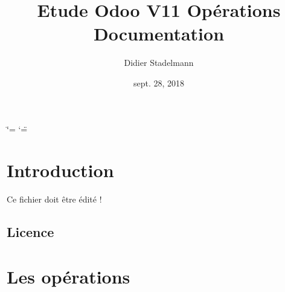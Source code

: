 \documentclass[letterpaper,10pt,french]{sphinxmanual}
\title{Etude Odoo V11 Opérations Documentation}
\date{sept. 28, 2018}
\author{Didier Stadelmann}
\begin{document}
\ifdefined\shorthandoff
  \ifnum\catcode`\=\string=\active\shorthandoff{=}\fi
  \ifnum\catcode`\"=\active{}\fi
\fi
\maketitle
\sphinxtableofcontents
{}\label{\detokenize{index::doc}}



\chapter{Introduction}
\label{\detokenize{intro:introduction}}\label{\detokenize{intro::doc}}
Ce fichier doit être édité !


\section{Licence}
\label{\detokenize{intro:licence}}



\chapter{Les opérations}
\label{\detokenize{readthedocs/operations:les-operations}}\label{\detokenize{readthedocs/operations::doc}}
\end{document}
